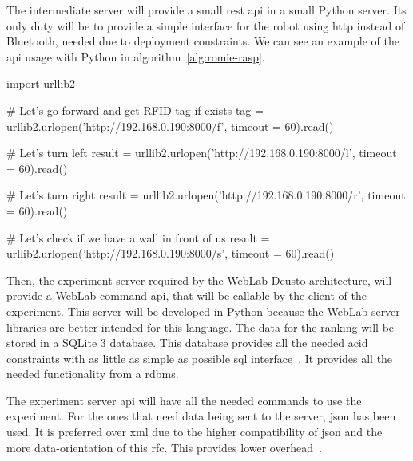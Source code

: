 The intermediate server will provide a small \acrshort{rest} \acrshort{api} in a small Python
server. Its only duty will be to provide a simple interface for the robot using \acrshort{http}
instead of Bluetooth, needed due to deployment constraints. We can see an example of the
\acrshort{api} usage with Python in algorithm~\ref{alg:romie-rasp}.

\begin{center}
\begin{minipage}{.9\textwidth}
\singlespace
\begin{pyglist}[language=python, caption={Romie \acrshort{rest} \acrshort{api} example.},
	label={alg:romie-rasp}, listingname={Algorithm}, numbers=left]
import urllib2

# Let's go forward and get RFID tag if exists
tag = urllib2.urlopen('http://192.168.0.190:8000/f', timeout = 60).read()

# Let's turn left
result = urllib2.urlopen('http://192.168.0.190:8000/l', timeout = 60).read()

# Let's turn right
result = urllib2.urlopen('http://192.168.0.190:8000/r', timeout = 60).read()

# Let's check if we have a wall in front of us
result = urllib2.urlopen('http://192.168.0.190:8000/s', timeout = 60).read()
\end{pyglist}
\end{minipage}
\end{center}

Then, the experiment server required by the WebLab-Deusto architecture, will provide a WebLab
command \acrshort{api}, that will be callable by the client of the experiment. This server will be
developed in Python because the WebLab server libraries are better intended for this language. The
data for the ranking will be stored in a SQLite 3 database. This database provides all the needed
\acrshort{acid} constraints with as little as simple as possible \acrshort{sql}
interface~\cite{sqlite}. It provides all the needed functionality from a \acrshort{rdbms}.

The experiment server \acrshort{api} will have all the needed commands to use the experiment. For
the ones that need data being sent to the server, \acrshort{json} has been used. It is preferred
over \acrshort{xml} due to the higher compatibility of \acrshort{json} and the more data-orientation
of this \acrshort{rfc}. This provides lower overhead~\cite{xml_vs_json}.

